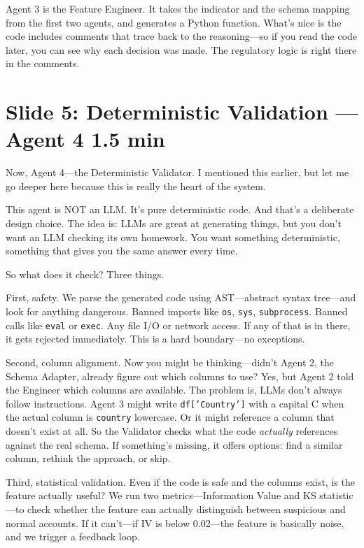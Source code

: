 \documentclass[11pt, a4paper]{article}
\newcommand{\timing}[1]{{\hfill\small\color{gray}#1}}
\begin{document}
Agent 3 is the Feature Engineer. It takes the indicator and the schema mapping from the first two agents, and generates a Python function. What's nice is the code includes comments that trace back to the reasoning---so if you read the code later, you can see why each decision was made. The regulatory logic is right there in the comments.

\section{Slide 5: Deterministic Validation --- Agent 4 \timing{1.5 min}}

Now, Agent 4---the Deterministic Validator. I mentioned this earlier, but let me go deeper here because this is really the heart of the system.

This agent is NOT an LLM. It's pure deterministic code. And that's a deliberate design choice. The idea is: LLMs are great at generating things, but you don't want an LLM checking its own homework. You want something deterministic, something that gives you the same answer every time.

So what does it check? Three things.

First, safety. We parse the generated code using AST---abstract syntax tree---and look for anything dangerous. Banned imports like \texttt{os}, \texttt{sys}, \texttt{subprocess}. Banned calls like \texttt{eval} or \texttt{exec}. Any file I/O or network access. If any of that is in there, it gets rejected immediately. This is a hard boundary---no exceptions.

Second, column alignment. Now you might be thinking---didn't Agent 2, the Schema Adapter, already figure out which columns to use? Yes, but Agent 2 told the Engineer which columns are available. The problem is, LLMs don't always follow instructions. Agent 3 might write \texttt{df['Country']} with a capital C when the actual column is \texttt{country} lowercase. Or it might reference a column that doesn't exist at all. So the Validator checks what the code \textit{actually} references against the real schema. If something's missing, it offers options: find a similar column, rethink the approach, or skip.

Third, statistical validation. Even if the code is safe and the columns exist, is the feature actually useful? We run two metrics---Information Value and KS statistic---to check whether the feature can actually distinguish between suspicious and normal accounts. If it can't---if IV is below 0.02---the feature is basically noise, and we trigger a feedback loop.
\end{document}
